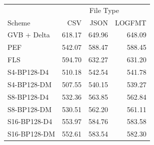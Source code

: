 \begin{tabular}{lrrr}
\toprule
 & \multicolumn{3}{c}{File Type} \\
Scheme & CSV & JSON & LOGFMT \\
\midrule
GVB + Delta & 618.17 & 649.96 & 648.09 \\
PEF & 542.07 & 588.47 & 588.45 \\
FLS & 594.70 & 632.27 & 631.20 \\
S4-BP128-D4 & 510.18 & 542.54 & 541.78 \\
S4-BP128-DM & 507.55 & 540.15 & 539.27 \\
S8-BP128-D4 & 532.36 & 563.85 & 562.84 \\
S8-BP128-DM & 530.51 & 562.20 & 561.11 \\
S16-BP128-D4 & 553.97 & 584.76 & 583.58 \\
S16-BP128-DM & 552.61 & 583.54 & 582.30 \\
\bottomrule
\end{tabular}
